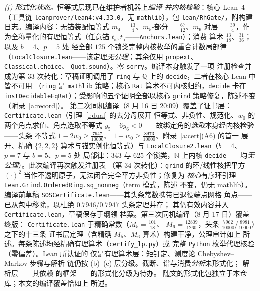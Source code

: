 \documentclass[11pt]{article}
\numberwithin{equation}{section}
\theoremstyle{definition}
\theoremstyle{remark}
\begin{document}
\emph{(f) 形式化状态。}恒等式层现已在维护者机器上\emph{编译
并内核检验}：核心 Lean~4（工具链
\texttt{leanprover/lean4:v4.33.0}，无 \texttt{mathlib}），包
\texttt{lean/RhGate/}，附构建日志。编译内容：无锚装配恒等式
$m_4=\tfrac{13}4$、$m_5$-部分 $=\tfrac{67}{12}$、$m_6$ 对层
$=\tfrac{39}4$，作为全称量化的有理恒等式（任意锚
$t_{\mathrm a},t_{\mathrm o}$——\texttt{Anchors.lean}）；消费
算术 $\tfrac{13}{18}$、$\tfrac{31}{36}$；以及 $b=4$、$p=5$ 处
经全部 $125$ 个锁类完整内核枚举的重合计数局部律
（\texttt{LocalClosure.lean}——该定理\emph{无公理}；其余仅用
\texttt{propext}、\texttt{Classical.choice}、
\texttt{Quot.sound}）。零 \texttt{sorry}。编译本身触发了一项
注册检查并成为第 $33$ 次转化：草稿证明调用了 \texttt{ring} 与
$\mathbb Q$ 上的 \texttt{decide}，二者在核心 Lean 中皆不可用
（\texttt{ring} 是 \texttt{mathlib} 策略；核心 \texttt{Rat}
算术不可内核归约，\texttt{decide} 卡在
\texttt{instDecidableEqRat}）；受影响的五个证明全部以核心
\texttt{grind} 策略修复，陈述不变（附录~\ref{a:record}）。
第二次同机编译（8 月 16 日 20:09）覆盖了证书层：
\texttt{Certificate.lean}（引理~\ref{l:dual} 的去分母展开
恒等式、非负性、规范化、$w_0$ 的两个角点求值、角点选取不等式
$y_5+6y_6<0$——故绑定角的\emph{选取}本身经内核检验——头条
不等式 $1-2w_0\ge\tfrac{7947}{10000}$、
$1-w_0\ge\tfrac{8973}{10000}$、附录~\ref{a:cert}(A6) 的首一
展开、精确 $\{2,2,2\}$ 算术与锚实例化恒等式）与
\texttt{LocalClosure2.lean}（$b=4$、$p=7$ 与 $b=5$、$p=5$ 处
局部律：$343$ 与 $625$ 个锁类，$\mathbb N$ 上内核
\texttt{decide}——均\emph{无公理}）。此次编译再次触发注册表
（第 $34$ 次转化）：\texttt{grind} 的环/线性核把平方
$(\cdot)^2$ 当作不透明原子，无法闭合完全平方非负性；修复为
\emph{核心}有序环引理
\texttt{Lean.Grind.OrderedRing.sq\_nonneg}（term 模式，陈述
不变，仍无 mathlib）。编译前草稿
\texttt{SOSCertificate.lean}——其头条常数携带已退役端点网格
角点——已从包中移除，以杜绝 $0.7946$/$0.7947$ 头条定理并存；
其仍有效内容并入 \texttt{Certificate.lean}，草稿保存于纲领
档案。第三次同机编译（8 月 17 日）覆盖终版：
\texttt{Certificate.lean} 于精确常数（$M_5=\tfrac{101}{18}$、
$M_6=\tfrac{12809}{1260}$，头条
$\tfrac{7962}{10000}$/$\tfrac{8981}{10000}$）之下的十三条
证书层定理（含精确 $M_5$、$M_6$ 算术）构建干净，公理审计如上
所述。每条陈述均经精确有理算术（\texttt{certify\_lp.py}）或
完整 \texttt{Python} 枚举代理核验（零偏差）。Lean 所认证的
仅是有理算术层：矩钉定、测度论 Chebyshev--Markov 步骤与解析
链仍按 (b)--(e) 层分级。截断、谱与消费\emph{分析}未形式化；
解析层——其依赖 \cite{C26} 的框架——的形式化分级为待办。
\cite{C26} 随文的形式化包独立于本仓库；本文的编译覆盖恰如上
所述。
\end{document}
